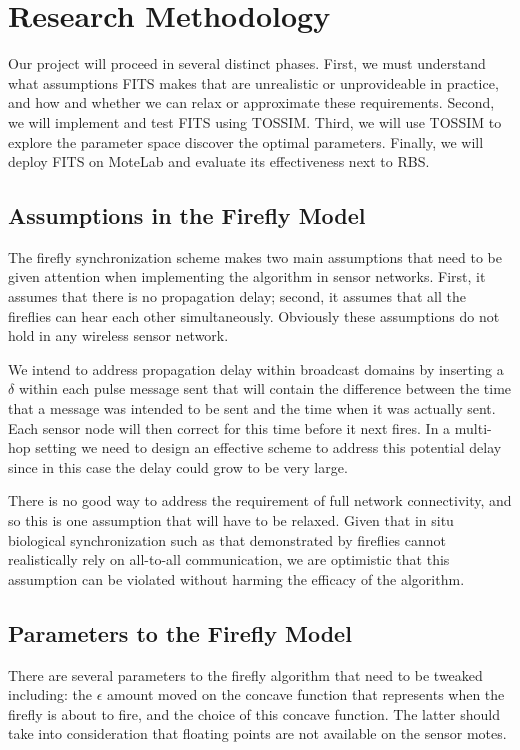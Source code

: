 \documentclass[8pt,twocolumn]{article}
\begin{document}
\section{Research Methodology}

Our project will proceed in several distinct phases.  First, we must
understand what assumptions FITS makes that are unrealistic or unprovideable
in practice, and how and whether we can relax or approximate these
requirements.  Second, we will implement and test FITS using TOSSIM.  Third,
we will use TOSSIM to explore the parameter space discover the optimal
parameters.  Finally, we will deploy FITS on MoteLab and evaluate its
effectiveness next to RBS.

\subsection{Assumptions in the Firefly Model} The firefly synchronization
scheme makes two main assumptions that need to be given attention when
implementing the algorithm in sensor networks. First, it assumes that there
is no propagation delay; second, it assumes that all the fireflies can
hear each other simultaneously.  Obviously these assumptions do not hold in
any wireless sensor network.

We intend to address propagation delay within broadcast domains
by inserting a $\delta$ within each pulse message sent that will contain the
difference between the time that a message was intended to be sent and the
time when it was actually sent.  Each sensor node will then correct for this
time before it next fires.  In a multi-hop setting we need to design an
effective scheme to address this potential delay since in this case the delay
could grow to be very large.

There is no good way to address the requirement of full network connectivity,
and so this is one assumption that will have to be relaxed.  Given that in
situ biological synchronization such as that demonstrated by fireflies cannot
realistically rely on all-to-all communication, we are optimistic that this
assumption can be violated without harming the efficacy of the algorithm.

\subsection{Parameters to the Firefly Model} There are several parameters to
the firefly algorithm that need to be tweaked including: the $\epsilon$
amount moved on the concave function that represents when the firefly is
about to fire, and the choice of this concave function. The latter should
take into consideration that floating points are not available on the sensor
motes.
\end{document}
